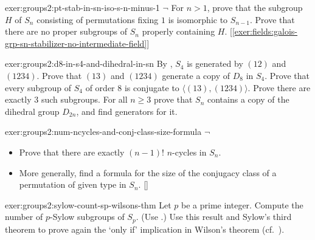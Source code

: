 \begin{exer}{}{exer:groups2:pt-stab-in-sn-iso-s-n-minus-1}
  $\lnot$ For $n > 1$, prove that the subgroup $H$ of $S_n$ consisting
  of permutations fixing $1$ is isomorphic to $S_{n-1}$. Prove that
  there are no proper subgroups of $S_n$ properly containing $H$.
  [\ref{exer:fields:galois-grp-sn-stabilizer-no-intermediate-field}]
\end{exer}
\begin{exer}{}{exer:groups2:d8-in-s4-and-dihedral-in-sn}
  By , $S_4$ is
  generated by $(12)$ and $(1234)$. Prove that $(13)$ and $(1234)$
  generate a copy of $D_8$ in $S_4$. Prove that every subgroup of
  $S_4$ of order $8$ is conjugate to $\langle(13),
  (1234)\rangle$. Prove there are exactly $3$ such subgroups. For all
  $n \geq 3$ prove that $S_n$ contains a copy of the dihedral group
  $D_{2n}$, and find generators for it.
\end{exer}
\begin{exer}{}{exer:groups2:num-ncycles-and-conj-class-size-formula}
  $\lnot$
  \begin{itemize}
  \item Prove that there are exactly $(n-1)!$ $n$-cycles in $S_n$.
  \item More generally, find a formula for the size of the conjugacy
    class of a permutation of given type in $S_n$.
    []
  \end{itemize}
\end{exer}
\begin{exer}{}{exer:groups2:sylow-count-sp-wilsons-thm}
  Let $p$ be a prime integer. Compute the number of $p$-Sylow
  subgroups of $S_p$. (Use
  .) Use
  this result and Sylow's third theorem to prove again the `only if'
  implication in Wilson's theorem (cf.\
  ).
\end{exer}

